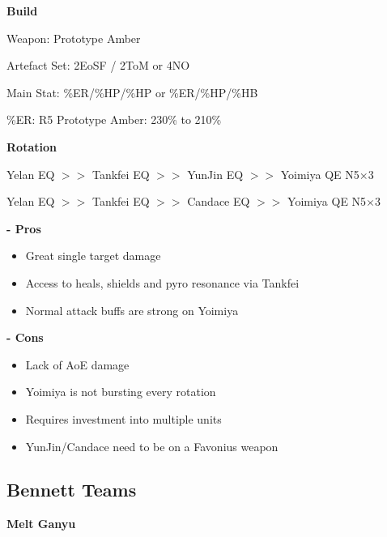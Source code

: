 \documentclass[11pt]{article}
\begin{document}
\textbf{\small{Build}}

Weapon: Prototype Amber

Artefact Set: 2EoSF / 2ToM or 4NO

Main Stat: \%ER/\%HP/\%HP or \%ER/\%HP/\%HB

\%ER: R5 Prototype Amber: 230\% to 210\%

\textbf{\small{Rotation}} 

\begin{center}
    Yelan EQ $>>$ Tankfei EQ $>>$ YunJin EQ $>>$ Yoimiya QE N5$\times$3
\end{center}
\begin{center}
    Yelan EQ $>>$ Tankfei EQ $>>$ Candace EQ $>>$ Yoimiya QE N5$\times$3
\end{center}

\textbf{\small{- Pros}}

\begin{itemize}
    \item Great single target damage
    \item Access to heals, shields and pyro resonance via Tankfei
    \item Normal attack buffs are strong on Yoimiya
\end{itemize}

\textbf{\small{- Cons}}

\begin{itemize}
    \item Lack of AoE damage 
    \item Yoimiya is not bursting every rotation
    \item Requires investment into multiple units
    \item YunJin/Candace need to be on a Favonius weapon
\end{itemize}

\newpage 

\subsection{Bennett Teams}

\textbf{Melt Ganyu}
\end{document}
